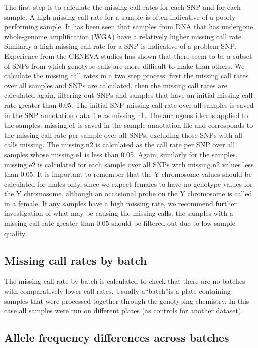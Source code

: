 \documentclass[
]{book}
\begin{document}
The ﬁrst step is to calculate the missing call rates for each SNP and for each sample. A high missing call rate for a sample is often indicative of a poorly performing sample. It has been seen that samples from DNA that has undergone whole-genome ampliﬁcation (WGA) have a relatively higher missing call rate. Similarly a high missing call rate for a SNP is indicative of a problem SNP. Experience from the GENEVA studies has shown that there seem to be a subset of SNPs from which genotype calls are more diﬃcult to make than others. We calculate the missing call rates in a two step process: ﬁrst the missing call rates over all samples and SNPs are calculated, then the missing call rates are calculated again, ﬁltering out SNPs and samples that have an initial missing call rate greater than 0.05. The initial SNP missing call rate over all samples is saved in the SNP annotation data ﬁle as missing.n1. The analogous idea is applied to the samples: missing.e1 is saved in the sample annotation ﬁle and corresponds to the missing call rate per sample over all SNPs, excluding those SNPs with all calls missing. The missing.n2 is calculated as the call rate per SNP over all samples whose missing.e1 is less than 0.05. Again, similarly for the samples, missing.e2 is calculated for each sample over all SNPs with missing.n2 values less than 0.05. It is important to remember that the Y chromosome values should be calculated for males only, since we expect females to have no genotype values for the Y chromosome, although an occasional probe on the Y chromosome is called in a female.
If any samples have a high missing rate, we recommend further investigation of what may be causing the missing calls; the samples with a missing call rate greater than 0.05 should be ﬁltered out due to low sample quality.

\hypertarget{missing-call-rates-by-batch}{%
\subsection{Missing call rates by batch}\label{missing-call-rates-by-batch}}

The missing call rate by batch is calculated to check that there are no batches with comparatively lower call rates. Usually a``batch''is a plate containing samples that were processed together through the genotyping chemistry. In this case all samples were run on diﬀerent plates (as controls for another dataset).

\hypertarget{allele-frequency-differences-across-batches}{%
\subsection{Allele frequency differences across batches}\label{allele-frequency-differences-across-batches}}
\end{document}
